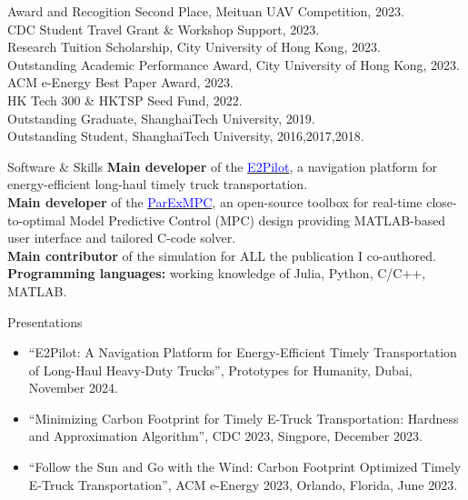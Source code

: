 \documentclass{resume} %
\begin{document}
\begin{rSection}{Award and Recogition}
    Second Place, Meituan UAV Competition, 2023. \\
    CDC Student Travel Grant \& Workshop Support, 2023. \\
    Research Tuition Scholarship, City University of Hong Kong, 2023. \\
    Outstanding Academic Performance Award, City University of Hong Kong, 2023. \\
    ACM e-Energy Best Paper Award, 2023. \\
    HK Tech 300 \& HKTSP Seed Fund, 2022. \\
    Outstanding Graduate, ShanghaiTech University, 2019. \\
    Outstanding Student, ShanghaiTech University, 2016,2017,2018.
\end{rSection}


\begin{rSection}{Software \& Skills}
    \textbf{Main developer} of the \href{https://www.e2pilots.com/}{\textcolor{blue}{E2Pilot}}, a navigation platform for energy-efficient long-haul timely truck transportation. \\
    \textbf{Main developer} of the \href{https://github.com/sujunyan/ParExMPC}{\textcolor{blue}{ParExMPC}}, an open-source toolbox for real-time close-to-optimal Model Predictive Control (MPC) design providing MATLAB-based user interface and tailored C-code solver. \\
    \textbf{Main contributor} of the simulation for ALL the publication I co-authored. \\
    \textbf{Programming languages:} working knowledge of Julia, Python, C/C++, MATLAB.
\end{rSection}


\begin{rSection}{Presentations}
    \begin{itemize}
        \item ``E2Pilot: A Navigation Platform for Energy-Efficient Timely Transportation of Long-Haul Heavy-Duty Trucks'', Prototypes for Humanity, Dubai, November 2024.
        \item ``Minimizing Carbon Footprint for Timely E-Truck Transportation: Hardness and Approximation Algorithm'', 
        CDC 2023, Singpore, December 2023.
        \item ``Follow the Sun and Go with the Wind: Carbon Footprint Optimized Timely E-Truck Transportation'', ACM e-Energy 2023, Orlando, Florida, June 2023.
    \end{itemize}
\end{rSection}
\end{document}
